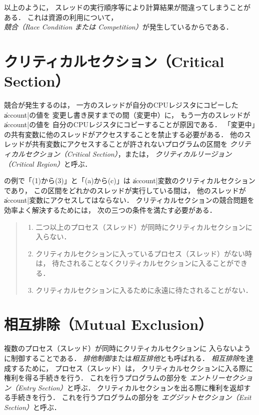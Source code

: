 以上のように，
スレッドの実行順序等により計算結果が間違ってしまうことがある．
これは資源の利用について，
\emph{競合（Race Condition または Competition）}が発生しているからである．

\section{クリティカルセクション（Critical Section）}
\label{criticalsection}
競合が発生するのは，
一方のスレッドが自分のCPUレジスタにコピーした\|account|の値を
変更し書き戻すまでの間（変更中）に，
もう一方のスレッドが\|account|の値を
自分のCPUレジスタにコピーすることが原因である．
「変更中」の共有変数に他のスレッドがアクセスすることを禁止する必要がある．
他のスレッドが共有変数にアクセスすることが許されないプログラムの区間を
\emph{クリティカルセクション（Critical Section）}，または，
\emph{クリティカルリージョン（Critical Region）}と呼ぶ．

の例で「(1)から(3)」と「(a)から(c)」は
\|account|変数のクリティカルセクションであり，
この区間をどれかのスレッドが実行している間は，
他のスレッドが\|account|変数にアクセスしてはならない．
クリティカルセクションの競合問題を効率よく解決するためには，
次の三つの条件を満たす必要がある．

\begin{quote}
  \begin{enumerate}
  \item 二つ以上のプロセス（スレッド）が同時にクリティカルセクションに入らない．
  \item クリティカルセクションに入っているプロセス（スレッド）がない時は，
    待たされることなくクリティカルセクションに入ることができる．
  \item クリティカルセクションに入るために永遠に待たされることがない．
  \end{enumerate}
\end{quote}

\section{相互排除（Mutual Exclusion）}
複数のプロセス（スレッド）が同時にクリティカルセクションに
入らないように制御することである．
\emph{排他制御}または\emph{相互排他}とも呼ばれる．
\emph{相互排除}を達成するために，
プロセス（スレッド）は，
クリティカルセクションに入る際に権利を得る手続きを行う．
これを行うプログラムの部分を
\emph{エントリーセクション（Entry Section）}と呼ぶ．
クリティカルセクションを出る際に権利を返却する手続きを行う．
これを行うプログラムの部分を
\emph{エグジットセクション（Exit Section）}と呼ぶ．

